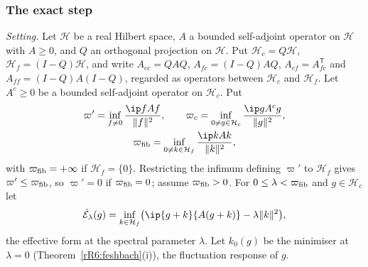 \subsubsection{The exact step}

\emph{Setting.} Let $\mathcal H$ be a real Hilbert space, $A$ a bounded
self-adjoint operator on $\mathcal H$ with $A\ge0$, and $Q$ an orthogonal
projection on $\mathcal H$. Put $\mathcal H_c=Q\mathcal H$, $\mathcal H_f=
(I-Q)\mathcal H$, and write $A_{cc}=QAQ$, $A_{fc}=(I-Q)AQ$, $A_{cf}=
A_{fc}^{\mathsf T}$ and $A_{ff}=(I-Q)A(I-Q)$, regarded as operators between
$\mathcal H_c$ and $\mathcal H_f$. Let $A^c\ge0$ be a bounded self-adjoint
operator on $\mathcal H_c$. Put
\begin{gather*}
\varpi'=\inf_{f\ne0}\frac{\ip f{Af}}{\lVert f\rVert^2},\qquad
\varpi_c=\inf_{0\ne g\in\mathcal H_c}\frac{\ip g{A^cg}}{\lVert g\rVert^2},
\\
\varpi_{\rm fib}=\inf_{0\ne k\in\mathcal H_f}\frac{\ip k{Ak}}{\lVert k
\rVert^2},
\end{gather*}
with $\varpi_{\rm fib}=+\infty$ if $\mathcal H_f=\{0\}$. Restricting the
infimum defining $\varpi'$ to $\mathcal H_f$ gives $\varpi'\le\varpi_{\rm
fib}$, so $\varpi'=0$ if $\varpi_{\rm fib}=0$; assume $\varpi_{\rm fib}>0$.
For $0\le\lambda<\varpi_{\rm fib}$ and $g\in\mathcal H_c$ let
\[
\tilde{\mathcal E}_\lambda(g)=\inf_{k\in\mathcal H_f}\bigl(\ip{g+k}{A(g+k)}
-\lambda\lVert k\rVert^2\bigr),
\]
the effective form at the spectral parameter $\lambda$. Let $k_0(g)$ be the
minimiser at $\lambda=0$ (Theorem~\ref{rR6:feshbach}(i)), the fluctuation
response of $g$.

